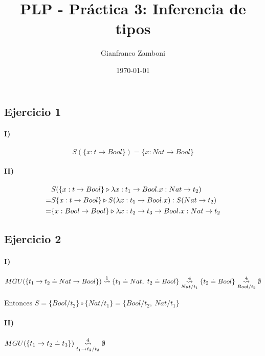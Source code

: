 \documentclass[10pt,a4paper]{article}
\begin{document}
\title{PLP - Práctica 3: Inferencia de tipos}

\date{\today}

\author{Gianfranco Zamboni}

\maketitle
\setcounter{page}{1}

\subsection{Ejercicio 1}
\paragraph{I)} $$S(\{x:t\to Bool\}) = \{x: Nat\to Bool\}$$
\paragraph{II)} 
\begin{equation*}
\begin{split}
&S(\judgeType{\{x:t\to Bool\}}{\lambdaAbs{x}{t_1\to Bool}{x}}{Nat\to t_2}) \\
= &\judgeType{S\{x:t\to Bool\}}{S(\lambdaAbs{x}{t_1\to Bool}{x})}{S(Nat\to t_2)} \\
= &\judgeType{\{x:Bool\to Bool\}}{\lambdaAbs{x}{t_2\to t_3\to Bool}{x}}{Nat\to t_2}
\end{split}
\end{equation*}

\subsection{Ejercicio 2}
\paragraph{I)}
\begin{align*}
MGU(\{t_1\to t_2\doteq Nat\to Bool\}) \goesTo{1}{} \{t_1\doteq Nat,~t_2\doteq Bool\} \goesTo{4}{Nat/t_1} \{t_2\doteq Bool\} \goesTo{4}{Bool/t_2} \emptyset
\end{align*}

Entonces $S=\{Bool/t_2\}\circ\{Nat/t_1\} = \{Bool/t_2,~Nat/t_1\}$

\paragraph{II)}$MGU(\{t_1\to t_2\doteq t_3\}) \goesTo{4}{t_1\to t_2/t_3} \emptyset$
\end{document}
